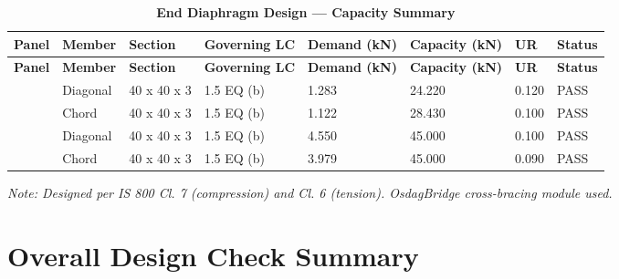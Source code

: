 \documentclass[12pt,a4paper]{report}
\numberwithin{table}{chapter}
\numberwithin{figure}{chapter}
\begin{document}
\begin{longtable}{|C{2.0cm}|L{1.8cm}|C{2.2cm}|C{3.0cm}|C{1.8cm}|C{1.8cm}|C{1.2cm}|C{1.8cm}|}
\caption{\textbf{End Diaphragm Design --- Capacity Summary}}
\hline
\textbf{Panel} & \textbf{Member} & \textbf{Section} & \textbf{Governing LC} & \textbf{Demand (kN)} & \textbf{Capacity (kN)} & \textbf{UR} & \textbf{Status} \\[6pt]
\hline
\endfirsthead

\hline
\textbf{Panel} & \textbf{Member} & \textbf{Section} & \textbf{Governing LC} & \textbf{Demand (kN)} & \textbf{Capacity (kN)} & \textbf{UR} & \textbf{Status} \\[6pt]
\hline
\endhead
{} & Diagonal & 40 x 40 x 3 & 1.5 EQ (b) & 1.283 & 24.220 & 0.120 & PASS \\[6pt]
 & Chord & 40 x 40 x 3 & 1.5 EQ (b) & 1.122 & 28.430 & 0.100 & PASS \\[6pt]
\hline
{} & Diagonal & 40 x 40 x 3 & 1.5 EQ (b) & 4.550 & 45.000 & 0.100 & PASS \\[6pt]
 & Chord & 40 x 40 x 3 & 1.5 EQ (b) & 3.979 & 45.000 & 0.090 & PASS \\[6pt]
\hline
\end{longtable}
\noindent\textit{Note: Designed per IS 800 Cl. 7 (compression) and Cl. 6 (tension). OsdagBridge cross-bracing module used.}

\section{Overall Design Check Summary}
\label{sec:overall-summary}
\end{document}

